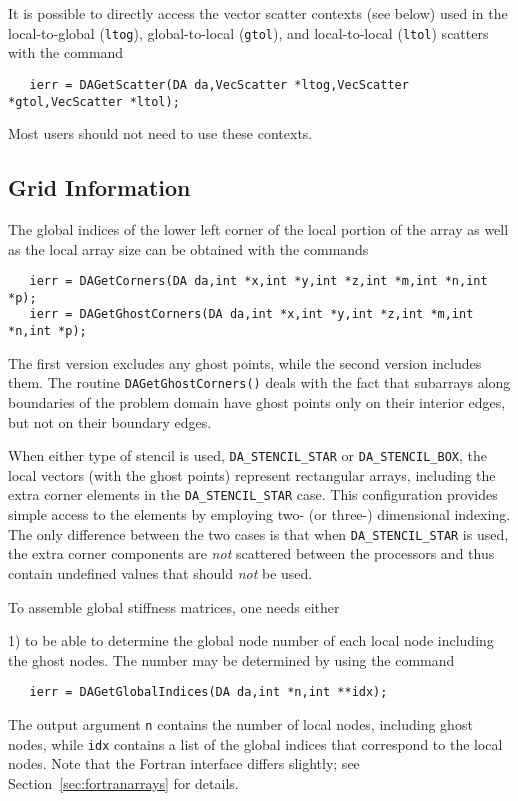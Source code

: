 It is possible to directly access the vector scatter contexts (see below)
used in the local-to-global ({\tt ltog}), global-to-local 
({\tt gtol}), and local-to-local ({\tt ltol})
scatters with the command 
\begin{verbatim}
   ierr = DAGetScatter(DA da,VecScatter *ltog,VecScatter *gtol,VecScatter *ltol);
\end{verbatim}
Most users should not need to use these contexts.

\subsection{Grid Information}

The global indices of the lower left corner of the local portion of the array 
as well as the local array size can be obtained with the commands
 
\begin{verbatim}
   ierr = DAGetCorners(DA da,int *x,int *y,int *z,int *m,int *n,int *p);
   ierr = DAGetGhostCorners(DA da,int *x,int *y,int *z,int *m,int *n,int *p);
\end{verbatim}
The first version excludes any ghost points, while the second version
includes them. 
The routine  {\tt DAGetGhostCorners()}
deals with the fact that subarrays along boundaries of the problem
domain have ghost points only on their interior edges, but not on
their boundary edges.

When either type of stencil is used, {\tt DA\_STENCIL\_STAR} or 
{\tt DA\_STENCIL\_BOX}, the local vectors (with the ghost points) 
represent rectangular arrays, including the extra corner elements in 
the {\tt DA\_STENCIL\_STAR} case. This configuration provides simple 
access to the elements by employing two- (or three-) dimensional indexing. 
The only difference between the 
two cases is that when {\tt DA\_STENCIL\_STAR} is used, the extra 
corner components are {\em not} scattered between the processors and thus
contain undefined values that should {\em not} be used.

To assemble global stiffness matrices, one needs either 

1) to be able to determine the global node number of each local node 
including the ghost nodes. The number may be determined by using the 
command 
\begin{verbatim}
   ierr = DAGetGlobalIndices(DA da,int *n,int **idx);
\end{verbatim}
The output argument {\tt n} contains the number of 
local nodes, including ghost nodes, while {\tt idx} contains
a list of the global indices that correspond to the local nodes.
Note that the Fortran interface differs slightly; see Section~\ref{sec:fortranarrays}
for details.

